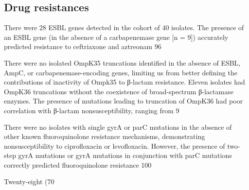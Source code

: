 \subsection{Drug resistances}
\label{sec:resistance}

There were 28 ESBL genes detected in the cohort of 40 isolates. The presence of an ESBL gene (in the absence of a carbapenemase gene [n = 9]) accurately predicted resistance to ceftriaxone and aztreonam 96%

There were no isolated OmpK35 truncations identified in the absence of ESBL, AmpC, or carbapenemase-encoding genes, limiting us from better defining the contributions of inactivity of Ompk35 to β-lactam resistance. Eleven isolates had OmpK36 truncations without the coexistence of broad-spectrum β-lactamase enzymes. The presence of mutations leading to truncation of OmpK36 had poor correlation with β-lactam nonsusceptibility, ranging from 9%

There were no isolates with single gyrA or parC mutations in the absence of other known fluoroquinolone resistance mechanisms, demonstrating nonsusceptibility to ciprofloxacin or levofloxacin. However, the presence of two-step gyrA mutations or gyrA mutations in conjunction with parC mutations correctly predicted fluoroquinolone resistance 100%

Twenty-eight (70%

